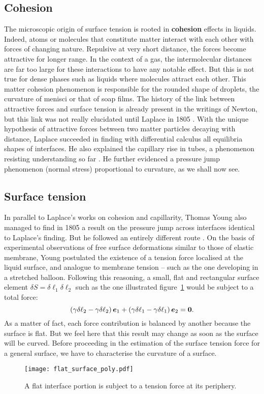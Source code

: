 \subsection{Cohesion}
The microscopic origin of surface tension is rooted in \textbf{cohesion} effects in liquids. Indeed, atoms or molecules that constitute matter interact with each other with forces of changing nature. Repulsive at very short distance, the forces become attractive for longer range. In the context of a gas, the intermolecular distances are far too large for these interactions to have any notable effect. But this is not true for dense phases such as liquids where molecules attract each other. This matter cohesion phenomenon is responsible for the rounded shape of droplets, the curvature of menisci or that of soap films. The history of the link between attractive forces and surface tension is already present in the writings of Newton, but this link was not really elucidated until Laplace in 1805 \citep{Laplace1805}. With the unique hypothesis of attractive forces between two matter particles decaying with distance, Laplace succeeded in finding with differential calculus all equilibria shapes of interfaces. He also explained the capillary rise in tubes, a phenomenon resisting understanding so far \citep{Rowlinson2005}. He further evidenced a pressure jump phenomenon (normal stress) proportional to curvature, as we shall now see.
\subsection{Surface tension}
In parallel to Laplace's works on cohesion and capillarity, Thomas Young also managed to find in 1805 a result on the pressure jump across interfaces identical to Laplace's finding. But he followed an entirely different route \citep{Young1805}. On the basis of experimental observations of free surface deformations similar to those of elastic membrane, Young postulated the existence of a tension force localised at the liquid surface, and analogue to membrane tension -- such as the one developing in a stretched balloon. Following this reasoning, a small, flat and rectangular surface element $\delta S = \delta \ell_1 \delta \ell_2$ such as the one illustrated figure~\ref{fig:flat_surface} would be subject to a total force:
$$
\lp \gamma \delta \ell_2 - \gamma \delta \ell_2 \rp \be_1 + \lp \gamma \delta \ell_1 - \gamma \delta \ell_1 \rp \be_2 = \boldsymbol 0.
$$
As a matter of fact, each force contribution is balanced by another because the surface is flat. But we feel here that this result may change as soon as the surface will be curved. Before proceeding in the estimation of the surface tension force for a general surface, we have to characterise the curvature of a surface.
\begin{figure}[htbp]
\begin{center}
\texttt{[image: flat\_surface\_poly.pdf]} \end{center}
\caption{A flat interface portion is subject to a tension force at its periphery.}
\label{fig:flat_surface}
\end{figure}

